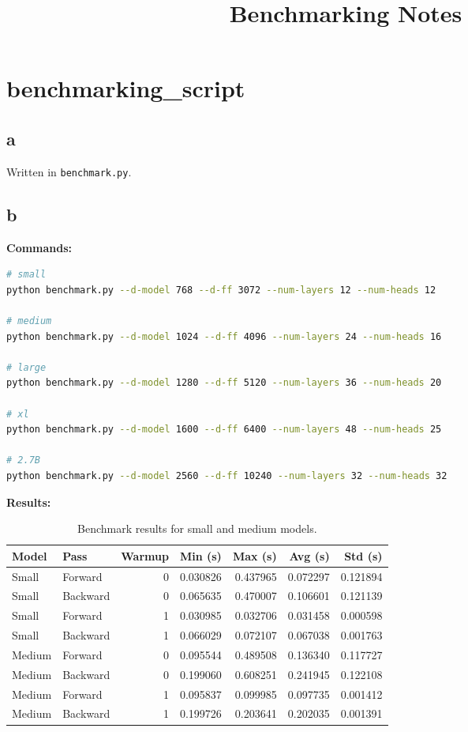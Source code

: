 \documentclass{article}
\title{Benchmarking Notes}
\author{}
\date{}
\begin{document}
\maketitle

\section{benchmarking\_script}

\subsection*{a}
Written in \texttt{benchmark.py}.

\subsection*{b}
\textbf{Commands:}
\begin{lstlisting}[language=bash]
# small
python benchmark.py --d-model 768 --d-ff 3072 --num-layers 12 --num-heads 12

# medium
python benchmark.py --d-model 1024 --d-ff 4096 --num-layers 24 --num-heads 16

# large
python benchmark.py --d-model 1280 --d-ff 5120 --num-layers 36 --num-heads 20

# xl
python benchmark.py --d-model 1600 --d-ff 6400 --num-layers 48 --num-heads 25

# 2.7B
python benchmark.py --d-model 2560 --d-ff 10240 --num-layers 32 --num-heads 32
\end{lstlisting}


\noindent\textbf{Results:}
\begin{table}[h!]
\centering
\caption{Benchmark results for small and medium models.}
\label{tab:benchmark}
\begin{tabular}{llrrrrr}
\toprule
Model & Pass & Warmup & Min (s) & Max (s) & Avg (s) & Std (s) \\
\midrule
Small  & Forward  & 0 & 0.030826 & 0.437965 & 0.072297 & 0.121894 \\
Small  & Backward & 0 & 0.065635 & 0.470007 & 0.106601 & 0.121139 \\
Small  & Forward  & 1 & 0.030985 & 0.032706 & 0.031458 & 0.000598 \\
Small  & Backward & 1 & 0.066029 & 0.072107 & 0.067038 & 0.001763 \\
Medium & Forward  & 0 & 0.095544 & 0.489508 & 0.136340 & 0.117727 \\
Medium & Backward & 0 & 0.199060 & 0.608251 & 0.241945 & 0.122108 \\
Medium & Forward  & 1 & 0.095837 & 0.099985 & 0.097735 & 0.001412 \\
Medium & Backward & 1 & 0.199726 & 0.203641 & 0.202035 & 0.001391 \\
\bottomrule
\end{tabular}
\end{table}
\end{document}
